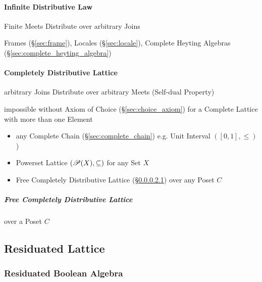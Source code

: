 \paragraph{Infinite Distributive Law}\label{sec:infinite_distributive}\hfill

Finite Meets Distribute over arbitrary Joins

Frames (\S\ref{sec:frame}), Locales (\S\ref{sec:locale}), Complete
Heyting Algebras (\S\ref{sec:complete_heyting_algebra})



\paragraph{Completely Distributive Lattice}
\label{sec:completely_distributive}\hfill

arbitrary Joins Distribute over arbitrary Meets (Self-dual Property)

impossible without Axiom of Choice (\S\ref{sec:choice_axiom}) for a
Complete Lattice with more than one Element

\begin{itemize}
  \item any Complete Chain (\S\ref{sec:complete_chain}) e.g. Unit
    Interval $([0,1], \leq)$)
  \item Powerset Lattice $(\mathscr{P}(X), \subseteq)$ for any Set
    $X$
  \item Free Completely Distributive Lattice
    (\S\ref{sec:free_completely_distributive_lattice}) over any Poset
    $C$
\end{itemize}



\subparagraph{Free Completely Distributive Lattice}
\label{sec:free_completely_distributive_lattice}\hfill

over a Poset $C$



\subsection{Residuated Lattice}\label{sec:residuated_lattice}

\subsubsection{Residuated Boolean Algebra}
\label{sec:residuated_boolean_algebra}



